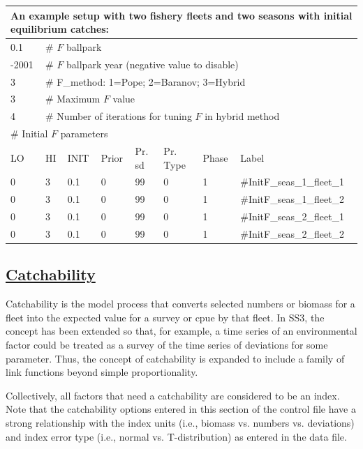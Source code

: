 \begin{longtable}{p{1.3cm} p{1cm} p{1cm} p{1cm} p{1.5cm} p{1.2cm} p{1cm} p{2.5cm}}
	\multicolumn{8}{l}{An example setup with two fishery fleets and two seasons with initial equilibrium catches:} \\
	\hline
	0.1 & \multicolumn{7}{l}{\# $F$ ballpark} \Tstrut\Bstrut\\
	\hline
	-2001 & \multicolumn{7}{l}{\# $F$ ballpark year (negative value to disable)} \Tstrut\Bstrut\\
	\hline
	3 & \multicolumn{7}{l}{\# F\_method: 1=Pope; 2=Baranov; 3=Hybrid} \Tstrut\Bstrut\\
	\hline
	3 & \multicolumn{7}{l}{\# Maximum $F$ value} \Tstrut\Bstrut\\
	\hline
	4 & \multicolumn{7}{l}{\# Number of iterations for tuning $F$ in hybrid method} \Tstrut\Bstrut\\
	\hline
	\multicolumn{8}{l}{\# Initial $F$ parameters} \Tstrut\Bstrut\\
	LO & HI & INIT & Prior & Pr. \gls{sd} & Pr. Type & Phase & Label \Bstrut\\
	\hline
	0 & 3 & 0.1 & 0 & 99 & 0 & 1 & \#InitF\_seas\_1\_fleet\_1 \Tstrut\\
	\hline
	0 & 3 & 0.1 & 0 & 99 & 0 & 1 & \#InitF\_seas\_1\_fleet\_2 \Tstrut\\
	\hline
	0 & 3 & 0.1 & 0 & 99 & 0 & 1 & \#InitF\_seas\_2\_fleet\_1 \Tstrut\\
	\hline
	0 & 3 & 0.1 & 0 & 99 & 0 & 1 & \#InitF\_seas\_2\_fleet\_2 \Tstrut\\
	\hline
\end{longtable}


\hypertarget{Qsetup}{}
\subsection[Catchability]{\protect\hyperlink{Qsetup}{Catchability}}
Catchability is the model process that converts selected numbers or biomass for a fleet into the expected value for a survey or \gls{cpue} by that fleet. In SS3, the concept has been extended so that, for example, a time series of an environmental factor could be treated as a survey of the time series of deviations for some parameter. Thus, the concept of catchability is expanded to include a family of link functions beyond simple proportionality.

Collectively, all factors that need a catchability are considered to be an index. Note that the catchability options entered in this section of the control file have a strong relationship with the index units (i.e., biomass vs. numbers vs. deviations) and index error type (i.e., normal vs. T-distribution) as entered in the data file.

